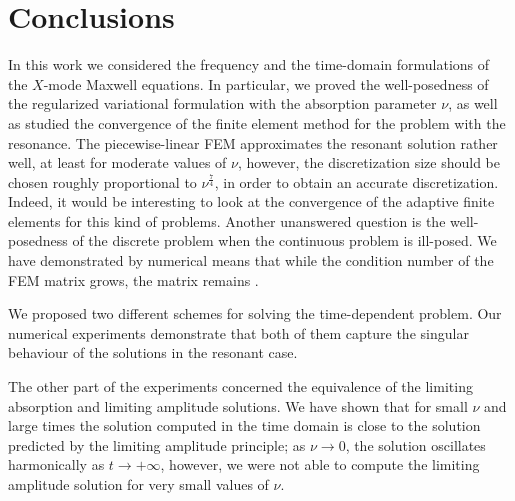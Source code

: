 \section{Conclusions}
In this work we considered the frequency  and the time-domain formulations of the $X$-mode Maxwell equations. 
In particular, we proved the well-posedness of the regularized variational formulation with
the absorption parameter $\nu$, as 
well as studied the convergence of the finite element method for the problem with the resonance. 
The piecewise-linear FEM approximates the resonant solution rather well, at least for moderate values of $\nu$, 
however, the discretization size should be chosen roughly proportional to $\nu^{\frac{7}{4}}$, in order to obtain an accurate discretization.
Indeed, it would be interesting to look at the convergence of the adaptive finite elements for this kind of problems. 
Another unanswered question is the well-posedness of the discrete problem when the continuous problem is ill-posed. We have 
demonstrated by numerical means that while the condition number of the FEM matrix grows, the matrix remains . 

We proposed two different schemes for solving the time-dependent problem. 
Our numerical experiments demonstrate that both of them capture the singular behaviour of the solutions in the resonant case.

The other part of the experiments concerned the equivalence of the limiting absorption and limiting amplitude solutions. We have shown 
that for small $\nu$ and large times the solution computed in the time domain is close to the solution predicted by the limiting amplitude principle; as 
$\nu\rightarrow 0$, the solution oscillates harmonically as $t\rightarrow +\infty$, however, we were not able to compute the limiting amplitude solution for very 
small values of $\nu$. 

\FloatBarrier